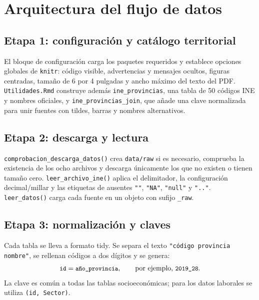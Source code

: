 \documentclass[11pt,a4paper]{article}
\newcommand{\code}[1]{\texttt{\small #1}}
\begin{document}
\section{Arquitectura del flujo de datos}
\subsection{Etapa 1: configuración y catálogo territorial}
El bloque de configuración carga los paquetes requeridos y establece opciones globales de \code{knitr}: código visible, advertencias y mensajes ocultos, figuras centradas, tamaño de 6 por 4 pulgadas y ancho máximo del texto del PDF. \code{Utilidades.Rmd} construye además \code{ine\_provincias}, una tabla de 50 códigos INE y nombres oficiales, y \code{ine\_provincias\_join}, que añade una clave normalizada para unir fuentes con tildes, barras y nombres alternativos.

\subsection{Etapa 2: descarga y lectura}
\code{comprobacion\_descarga\_datos()} crea \code{data/raw} si es necesario, comprueba la existencia de los ocho archivos y descarga únicamente los que no existen o tienen tamaño cero. \code{leer\_archivo\_ine()} aplica el delimitador, la configuración decimal/millar y las etiquetas de ausentes \code{""}, \code{"NA"}, \code{"null"} y \code{".."}. \code{leer\_datos()} carga cada fuente en un objeto con sufijo \code{\_raw}.

\subsection{Etapa 3: normalización y claves}
Cada tabla se lleva a formato tidy. Se separa el texto \code{"código provincia nombre"}, se rellenan códigos a dos dígitos y se genera:
\[
\code{id} = \code{año\_provincia},\qquad \text{por ejemplo, }\code{2019\_28}.
\]
La clave es común a todas las tablas socioeconómicas; para los datos laborales se utiliza \code{(id, Sector)}.
\end{document}
